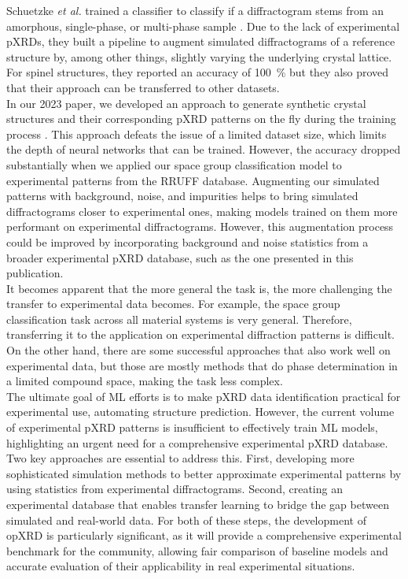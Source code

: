Schuetzke {\it et al.} trained a classifier to classify if a diffractogram stems from an amorphous, single-phase, or multi-phase sample \cite{Schuetzke2024}. Due to the lack of experimental pXRDs, they built a pipeline to augment simulated diffractograms of a reference structure by, among other things, slightly varying the underlying crystal lattice. For spinel structures, they reported an accuracy of \SI{100}{\percent} but they also proved that their approach can be transferred to other datasets.\\

In our 2023 paper, we developed an approach to generate synthetic crystal structures and their corresponding pXRD patterns on the fly during the training process \cite{Schopmans2023}. This approach defeats the issue of
a limited dataset size, which limits the depth of neural networks that can be trained. However, the accuracy dropped substantially when we applied our space group classification model to experimental patterns from the RRUFF database. Augmenting our simulated patterns with background, noise, and impurities helps to bring simulated diffractograms closer to experimental ones, making models trained on them more performant on experimental diffractograms. However, this augmentation process could be improved by incorporating background and noise statistics from a broader experimental pXRD database, such as the one presented in this publication.\\

It becomes apparent that the more general the task is, the more challenging the transfer to experimental data becomes. For example, the space group classification task across all material systems is very general. Therefore, transferring it to the application on experimental diffraction patterns is difficult. \cite{Schopmans2023, Lee2022, Vecsei2018} On the other hand, there are some successful approaches that also work well on experimental data, but those are mostly methods that do phase determination in a limited compound space, making the task less complex. \cite{Schuetzke2024, Lee2020}\\

The ultimate goal of ML efforts is to make pXRD data identification practical for experimental use, automating structure prediction. However, the current volume of experimental pXRD patterns is insufficient to effectively train ML models, highlighting an urgent need for a comprehensive experimental pXRD database. Two key approaches are essential to address this. First, developing more sophisticated simulation methods to better approximate experimental patterns\cite{cao2024simxrd} by using statistics from experimental diffractograms. Second, creating an experimental database that enables transfer learning to bridge the gap between simulated and real-world data. For both of these steps, the development of opXRD is particularly significant, as it will provide a comprehensive experimental benchmark for the community, allowing fair comparison of baseline models and accurate evaluation of their applicability in real experimental situations.